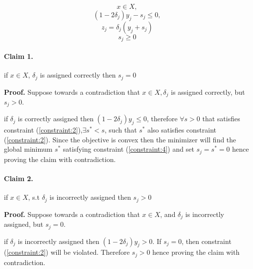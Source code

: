 \documentclass{article}
\begin{document}
\begin{equation}\label{constraint:1}
x \in X,
\end{equation}
\begin{equation}\label{constraint:2}
(1-2\delta_j)y_j - s_j \leq 0,
\end{equation}
\begin{equation}\label{constraint:3}
z_j = \delta_j(y_j +s_j)
\end{equation}
\begin{equation}\label{constraint:4}
s_j \geq 0
\end{equation}


\paragraph{Claim 1.} if \forall $x \in X$, $\delta_j$ is assigned correctly then $s_j = 0$

\noindent
\textbf{Proof.}
Suppose towards a contradiction that \forall $x \in X, \delta_j$ is assigned correctly, but $s_j > 0$.

\noindent
if $\delta_j$ is correctly assigned then $(1-2\delta_j)y_j \leq 0$, therefore $\forall  s > 0$ that satisfies constraint (\ref{constraint:2}),$\exists s^* < s$, such that $s^*$ also satisfies constraint (\ref{constraint:2}). Since the objective is convex then the minimizer will find the global minimum $s^*$ satisfying constraint (\ref{constraint:4}) and set $s_j = s^* = 0$ hence proving the claim with contradiction.


\paragraph{Claim 2.} if \exists $x \in X$, s.t $\delta_j$ is incorrectly assigned  then $s_j > 0$

\noindent
\textbf{Proof.}
Suppose towards a contradiction that \exists $x \in X$, and $\delta_j$ is incorrectly assigned, but $s_j = 0$.

\noindent
if $\delta_j$ is incorrectly assigned then $(1-2\delta_j)y_j > 0$. If $s_j = 0$, then constraint (\ref{constraint:2}) will be violated. Therefore $s_j > 0$ hence proving the claim with contradiction.
\end{document}
